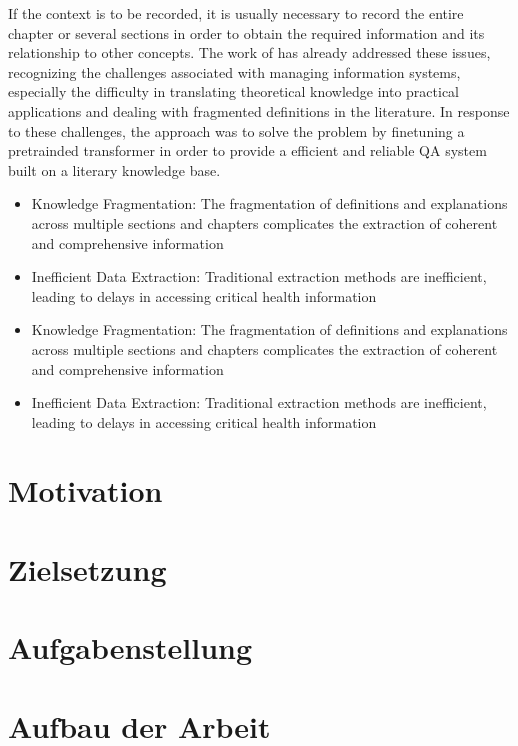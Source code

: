 If the context is to be recorded, it is usually necessary to record the entire chapter or several sections in order to obtain the required information and its relationship to other concepts. 
The work of \citet{Paul_Keller} has already addressed these issues, recognizing the challenges associated with managing information systems, especially the difficulty in translating theoretical knowledge into practical applications and dealing with fragmented definitions in the literature. 
In response to these challenges, the approach was to solve the problem by finetuning a pretrainded transformer in order to provide a efficient and reliable QA system built on a literary knowledge base.
%
%
\begin{itemize}
\item Knowledge Fragmentation: The fragmentation of definitions and explanations across multiple sections and chapters complicates the extraction of coherent and comprehensive information
\item Inefficient Data Extraction: Traditional extraction methods are inefficient, leading to delays in accessing critical health information
%
\end{itemize}
\begin{itemize}
\item Knowledge Fragmentation: The fragmentation of definitions and explanations across multiple sections and chapters complicates the extraction of coherent and comprehensive information
\item Inefficient Data Extraction: Traditional extraction methods are inefficient, leading to delays in accessing critical health information

\end{itemize}
\section{Motivation}


\section{Zielsetzung}\label{sec:zielsetzung}


\section{Aufgabenstellung}



\section{Aufbau der Arbeit}
